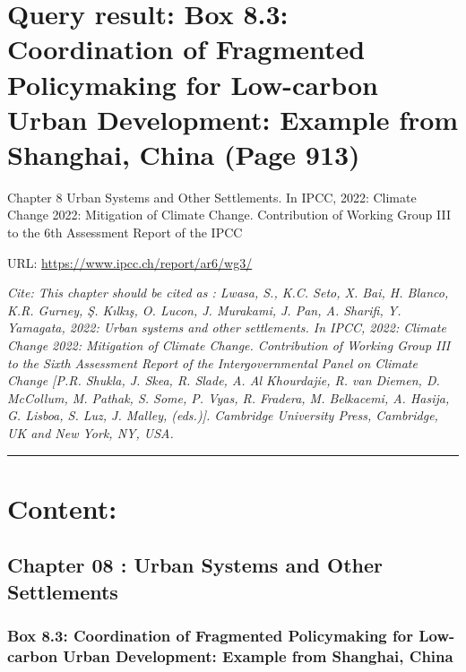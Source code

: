 \documentclass[
  letterpaper,
  DIV=11,
  numbers=noendperiod]{scrreprt}
\begin{document}
\hypertarget{query-result-box-8.3-coordination-of-fragmented-policymaking-for-low-carbon-urban-development-example-from-shanghai-china-page-913}{%
\section{Query result: Box 8.3: Coordination of Fragmented Policymaking
for Low-carbon Urban Development: Example from Shanghai, China (Page
913)}\label{query-result-box-8.3-coordination-of-fragmented-policymaking-for-low-carbon-urban-development-example-from-shanghai-china-page-913}}

Chapter 8 Urban Systems and Other Settlements. In IPCC, 2022: Climate
Change 2022: Mitigation of Climate Change. Contribution of Working Group
III to the 6th Assessment Report of the IPCC

URL: \url{https://www.ipcc.ch/report/ar6/wg3/}

\emph{Cite: This chapter should be cited as : Lwasa, S., K.C. Seto, X.
Bai, H. Blanco, K.R. Gurney, Ş. Kılkış, O. Lucon, J. Murakami, J. Pan,
A. Sharifi, Y. Yamagata, 2022: Urban systems and other settlements. In
IPCC, 2022: Climate Change 2022: Mitigation of Climate Change.
Contribution of Working Group III to the Sixth Assessment Report of the
Intergovernmental Panel on Climate Change {[}P.R. Shukla, J. Skea, R.
Slade, A. Al Khourdajie, R. van Diemen, D. McCollum, M. Pathak, S. Some,
P. Vyas, R. Fradera, M. Belkacemi, A. Hasija, G. Lisboa, S. Luz, J.
Malley, (eds.){]}. Cambridge University Press, Cambridge, UK and New
York, NY, USA.}

\begin{center}\rule{0.5\linewidth}{0.5pt}\end{center}

\hypertarget{content-4}{%
\section{Content:}\label{content-4}}

\hypertarget{chapter-08-urban-systems-and-other-settlements-1}{%
\subsection{Chapter 08 : Urban Systems and Other
Settlements}\label{chapter-08-urban-systems-and-other-settlements-1}}

\hypertarget{box-8.3-coordination-of-fragmented-policymaking-for-low-carbon-urban-development-example-from-shanghai-china}{%
\subsubsection{Box 8.3: Coordination of Fragmented Policymaking for
Low-carbon Urban Development: Example from Shanghai,
China}\label{box-8.3-coordination-of-fragmented-policymaking-for-low-carbon-urban-development-example-from-shanghai-china}}
\end{document}
